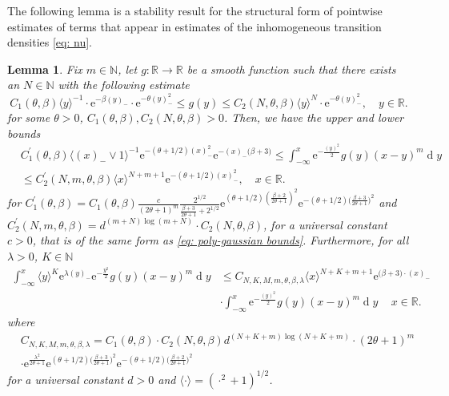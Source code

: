 \documentclass[11pt, reqno]{amsart}
\numberwithin{equation}{section}
\newcounter{dummy} \numberwithin{dummy}{section}
\newtheorem{lemma}[dummy]{Lemma}
\newcommand{\N}{\ensuremath{\mathbb{N}}}
\newcommand{\R}{\ensuremath{\mathbb{R}}}
\newcommand{\diff}{\ensuremath{\operatorname{d}\!}}
\begin{document}
The following lemma is a stability result for the structural form of pointwise estimates of terms that appear in estimates of the inhomogeneous transition densities \ref{eq: nu}.
\begin{lemma}\label{lemma: integral estimate}
Fix $m\in \N$, let $g:\R\to \R $ be a smooth function such that there exists an $N\in \N$ with the following estimate
\begin{equation*}\label{eq: poly-gaussian bounds}
    C_1(\theta, \beta)\langle y\rangle^{-1}\cdot \mathrm{e}^{-\beta(y)_-}\cdot \mathrm{e}^{-\theta(y)^2_-} \le g(y) \le C_2(N, \theta, \beta) \langle y\rangle^{N}\cdot \mathrm{e}^{-\theta(y)^2_-},\quad y\in \R.
\end{equation*}
for some $\theta >0$, $C_1(\theta, \beta), C_2(N, \theta, \beta)>0$. Then, we have the upper and lower bounds
    \begin{align*}
          &C^\prime_1(\theta, \beta)\langle (x)_-\lor 1 \rangle ^{-1} \mathrm{e}^{-(\theta + 1/2)(x)_-^2}\mathrm{e}^{-(x)_-\big(\beta+3\big)}\le \displaystyle\int^x_{-\infty}\mathrm{e}^{-\frac{(y)^2}{2}} g(y)(x-y)^m\diff y \\
         & \le C^\prime_2(N, m, \theta, \beta)\langle x\rangle ^{N+m+1}\mathrm{e}^{-(\theta+1/2)(x)_-^2},\quad x\in \R.
    \end{align*}
for $C^\prime_1(\theta, \beta) = C_1(\theta, \beta)\frac{c}{(2\theta+1)^m}\frac{2^{1/2}}{\frac{\beta+3}{2\theta +1} +  2^{1/2}}\mathrm{e}^{(\theta + 1/2)(\frac{\beta+2}{2\theta +1})^2}\mathrm{e}^{-(\theta + 1/2)\big(\frac{\beta+3}{2\theta +1}\big)^2}$ and\\ $C^\prime_2(N, m, \theta, \beta) =  d^{(m+N)\log (m+N)}\cdot C_2(N, \theta, \beta)$, for a universal constant $c>0$, that is of the same form as \ref{eq: poly-gaussian bounds}. Furthermore, for all $\lambda>0$, $K\in \N$
\begin{align*}
    \displaystyle\int^x_{-\infty} \langle y \rangle^K \mathrm{e}^{\lambda(y)_-}\mathrm{e}^{-\frac{y^2}{2}} g(y)(x-y)^m\diff y &\le C_{N,K, M, m, \theta, \beta, \lambda}  \langle x\rangle ^{N+K+m+1}\mathrm{e}^{\big(\beta +3\big)\cdot (x)_-}\\
    & \cdot\displaystyle\int^x_{-\infty}\mathrm{e}^{-\frac{(y)^2}{2}} g(y)(x-y)^m\diff y\, \quad x\in \R.
\end{align*}
where 
\begin{align*}
         & C_{N,K,M,m,\theta, \beta, \lambda}=C_1(\theta, \beta) \cdot C_2(N, \theta, \beta) d^{(N+K+m)\log(N+K+m)}\cdot(2\theta+1)^m  \\
         & \cdot \mathrm{e}^{\frac{\lambda^2}{2\theta + 1}} \mathrm{e}^{(\theta + 1/2)\big(\frac{\beta+3}{2\theta +1}\big)^2} \mathrm{e}^{-(\theta + 1/2)\big(\frac{\beta+2}{2\theta +1}\big)^2}
    \end{align*}
for a universal constant $d>0$ and $\langle\cdot \rangle = (\cdot ^2 + 1)^{1/2}$. 
\end{lemma}
\end{document}
